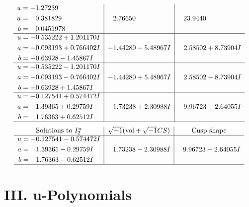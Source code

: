 \documentclass[1p]{elsarticle_modified}
\theoremstyle{definition}
\newcommand{\I}{\sqrt{-1}}
\begin{document}
$$\begin{array}{c|c|c}
\begin{aligned}
u &= -1.27239\phantom{ +0.000000I} \\
a &= \phantom{-}0.381829\phantom{ +0.000000I} \\
b &= -0.0451978\phantom{ +0.000000I}\end{aligned}
 & \phantom{-}2.76650\phantom{ +0.000000I} & \phantom{-}23.9440\phantom{ +0.000000I} \\ \hline\begin{aligned}
u &= -0.535222 + 1.201170 I \\
a &= -0.093193 + 0.766402 I \\
b &= -0.63928 - 1.45867 I\end{aligned}
 & -1.44280 - 5.48967 I & \phantom{-}2.58502 + 8.73904 I \\ \hline\begin{aligned}
u &= -0.535222 - 1.201170 I \\
a &= -0.093193 - 0.766402 I \\
b &= -0.63928 + 1.45867 I\end{aligned}
 & -1.44280 + 5.48967 I & \phantom{-}2.58502 - 8.73904 I \\ \hline\begin{aligned}
u &= -0.127541 + 0.574472 I \\
a &= \phantom{-}1.39365 + 0.29759 I \\
b &= \phantom{-}1.76363 + 0.62512 I\end{aligned}
 & \phantom{-}1.73238 + 2.30988 I & \phantom{-}9.96723 - 2.64055 I\\
 \hline 
 \end{array}$$\newpage$$\begin{array}{c|c|c}  
\text{Solutions to }I^u_{2}& \I (\text{vol} + \sqrt{-1}CS) & \text{Cusp shape}\\
 \hline 
\begin{aligned}
u &= -0.127541 - 0.574472 I \\
a &= \phantom{-}1.39365 - 0.29759 I \\
b &= \phantom{-}1.76363 - 0.62512 I\end{aligned}
 & \phantom{-}1.73238 - 2.30988 I & \phantom{-}9.96723 + 2.64055 I\\
 \hline 
 \end{array}$$\newpage
\newpage\renewcommand{\arraystretch}{1}
\centering \section*{ III. u-Polynomials}
\end{document}
